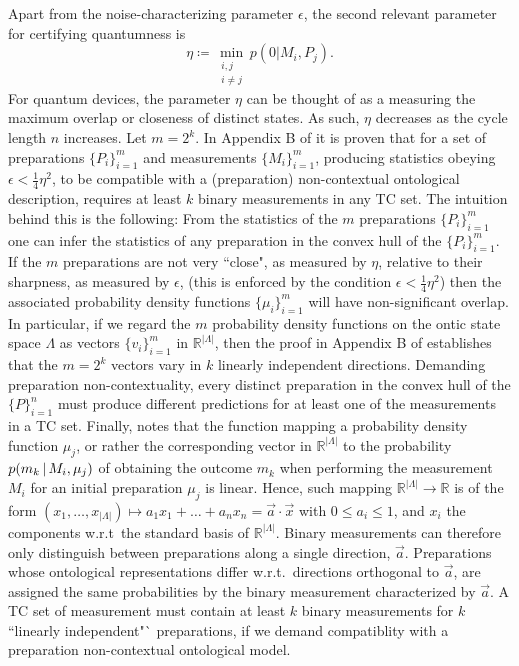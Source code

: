 Apart from the noise-characterizing parameter $\epsilon$, the second relevant parameter for certifying quantumness is
\begin{equation*}
\eta\coloneqq \min_{\substack{i,j \\ i\neq j}} p(0\vert M_i, P_j).
\end{equation*}
For quantum devices, the parameter $\eta$ can be thought of as a measuring the maximum overlap or closeness of distinct states. As such, $\eta$ decreases as the cycle length $n$ increases. Let $m=2^k$. In Appendix B of \cite{Pusey2019a} it is proven that for a set of preparations $\{P_i\}_{i=1}^m$ and measurements $\{M_i\}_{i=1}^m$, producing statistics obeying $\epsilon<\frac{1}{4}\eta^2$, to be compatible with a (preparation) non-contextual ontological description, requires at least $k$ binary measurements in any TC set. The intuition behind this is the following: From the statistics of the $m$ preparations $\{P_i\}_{i=1}^m$ one can infer the statistics of any preparation in the convex hull of the $\{P_i\}_{i=1}^m$. If the $m$ preparations are not very ``close", as measured by $\eta$, relative to their sharpness, as measured by $\epsilon$, (this is enforced by the condition $\epsilon<\frac{1}{4}\eta^2$) then the associated probability density functions $\{\mu_i\}_{i=1}^m$ will have non-significant overlap. In particular, if we regard the $m$ probability density functions on the ontic state space $\Lambda$ as vectors $\{v_i\}_{i=1}^m$ in $\mathbb{R}^{\vert \Lambda \vert}$, then the proof in Appendix B of \cite{Pusey2019a} establishes that the $m=2^k$ vectors vary in $k$ linearly independent directions. Demanding preparation non-contextuality, every distinct preparation in the convex hull of the $\{P\}_{i=1}^n$ must produce different predictions for at least one of the measurements in a TC set. Finally, \cite{Pusey2019a} notes that the function mapping a probability density function $\mu_j$, or rather the corresponding vector in $\mathbb{R}^{\vert \Lambda \vert}$ to the probability $p(m_k\thinspace\vert\thinspace M_i,\mu_j)$ of obtaining the outcome $m_k$ when performing the measurement $M_i$ for an initial preparation $\mu_j$ is linear. Hence, such mapping $\mathbb{R}^{\vert \Lambda \vert}\rightarrow\mathbb{R}$ is of the form $(x_1,\dots,x_{\vert \Lambda \vert})\mapsto a_1 x_1+\dots + a_n x_n = \vec{a}\cdot \vec{x}$ with $0 \leq a_i \leq 1$, and $x_i$ the components w.r.t\ the standard basis of $\mathbb{R}^{\vert \Lambda \vert}$. Binary measurements can therefore only distinguish between preparations along a single direction, $\vec{a}$. Preparations whose ontological representations differ w.r.t.\ directions orthogonal to $\vec{a}$, are assigned the same probabilities by the binary measurement characterized by $\vec{a}$. A TC set of measurement must contain at least $k$ binary measurements for $k$ ``linearly independent"` preparations, if we demand compatiblity with a preparation non-contextual ontological model.

